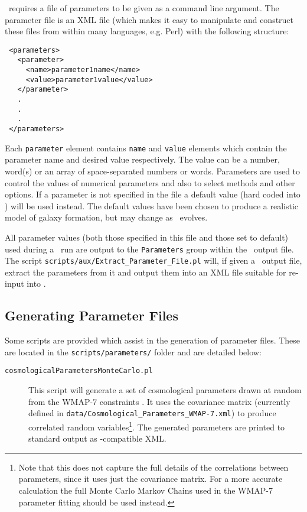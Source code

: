 \glc\ requires a file of parameters to be given as a command line argument. The parameter file is an XML file (which makes it easy to manipulate and construct these files from within many languages, e.g. Perl) with the following structure:
\begin{verbatim}
 <parameters>
   <parameter>
     <name>parameter1name</name>
     <value>parameter1value</value>
   </parameter>
   .
   .
   .
 </parameters>
\end{verbatim}
Each {\tt parameter} element contains {\tt name} and {\tt value} elements which contain the parameter name and desired value respectively. The value can be a number, word(s) or an array of space-separated numbers or words. Parameters are used to control the values of numerical parameters and also to select methods and other options. If a parameter is not specified in the file a default value (hard coded into \glc) will be used instead. The default values have been chosen to produce a realistic model of galaxy formation, but may change as \glc\ evolves.

All parameter values (both those specified in this file and those set to default) used during a \glc\ run are output to the {\tt Parameters} group within the \glc\ output file. The script {\tt scripts/aux/Extract\_Parameter\_File.pl} will, if given a \glc\ output file, extract the parameters from it and output them into an XML file suitable for re-input into \glc.

\subsection{Generating Parameter Files}

Some scripts are provided which assist in the generation of parameter files. These are located in the {\tt scripts/parameters/} folder and are detailed below:
\begin{description}
\item [{\tt cosmologicalParametersMonteCarlo.pl}] This script will generate a set of cosmological parameters drawn at random from the WMAP-7 constraints \cite{komatsu_seven-year_2010}. It uses the covariance matrix (currently defined in {\tt data/Cosmological\_Parameters\_WMAP-7.xml}) to produce correlated random variables\footnote{Note that this does not capture the full details of the correlations between parameters, since it uses just the covariance matrix. For a more accurate calculation the full Monte Carlo Markov Chains used in the WMAP-7 parameter fitting should be used instead.}. The generated parameters are printed to standard output as \glc-compatible XML.
\end{description}

